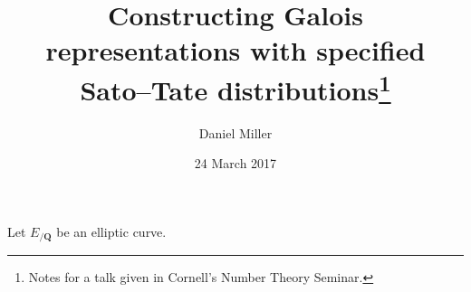 \documentclass{article}
\title{Constructing Galois representations with specified Sato--Tate 
distributions\thanks{Notes for a talk given in Cornell's Number Theory 
Seminar.}}
\author{Daniel Miller}
\date{24 March 2017}
\newcommand{\bQ}{\mathbf{Q}}
\begin{document}
\maketitle





Let $E_{/\bQ}$ be an elliptic curve. 
\end{document}
